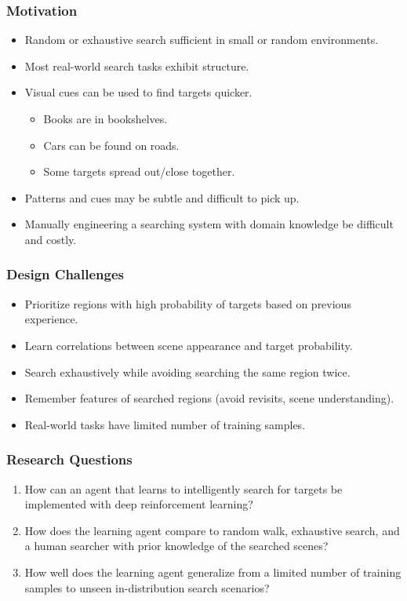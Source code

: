 \begin{frame}
    \frametitle{Motivation}

    \begin{itemize}
        \item Random or exhaustive search sufficient in small or random environments.
        \item Most real-world search tasks exhibit structure.
        \item Visual cues can be used to find targets quicker.
        \begin{itemize}
            \item Books are in bookshelves.
            \item Cars can be found on roads.
            \item Some targets spread out/close together.
        \end{itemize}
        \item Patterns and cues may be subtle and difficult to pick up.
        \item Manually engineering a searching system with domain knowledge be difficult and costly.
    \end{itemize}
\end{frame}

\begin{frame}
    \frametitle{Design Challenges}

    \begin{itemize}
        \item Prioritize regions with high probability of targets based on previous experience.
        \item Learn correlations between scene appearance and target probability.
        \item Search exhaustively while avoiding searching the same region twice.
        \item Remember features of searched regions (avoid revisits, scene understanding).
        \item Real-world tasks have limited number of training samples.
    \end{itemize}
\end{frame}

\begin{frame}
    \frametitle{Research Questions}
    \begin{enumerate}
        \item How can an agent that learns to intelligently search for targets be implemented with deep reinforcement learning?
        \item How does the learning agent compare to random walk, exhaustive search, and a human searcher with prior knowledge of the searched scenes?
        \item How well does the learning agent generalize from a limited number of training samples to unseen in-distribution search scenarios?
    \end{enumerate}    
\end{frame}